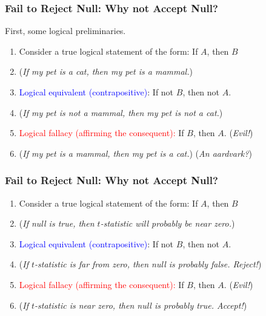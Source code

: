 \documentclass[handout, 9pt]{beamer}
\begin{document}
\begin{frame}
	\frametitle{Fail to Reject Null: Why not Accept Null?}
	First, some logical preliminaries.
	\begin{enumerate}
		\item<2-> Consider a true logical statement of the form: If $A$, then $B$
		\item<3->[] (\emph{If my pet is a cat, then my pet is a mammal.})\\[2em]
		
		\item<4-> \textcolor{blue}{Logical equivalent (contrapositive)}: If not $B$, then not $A$.
		\item<5->[] (\emph{If my pet is not a mammal, then my pet is not a cat.})\\[2em]
		
		\item<6-> \textcolor{red}{Logical fallacy (affirming the consequent):} If $B$, then $A$. \hfill (\emph{Evil!})
		\item<7->[] (\emph{If my pet is a mammal, then my pet is a cat.}) \hfill (\emph{An aardvark?})
	\end{enumerate}
\end{frame}





\begin{frame}
	\frametitle{Fail to Reject Null: Why not Accept Null?}
	\begin{enumerate}
		\item<1-> Consider a true logical statement of the form: If $A$, then $B$
		\item<2->[] (\emph{If null is true, then $t$-statistic will probably be near zero.})\\[2em]
		
		\item<3-> \textcolor{blue}{Logical equivalent (contrapositive)}: If not $B$, then not $A$.
		\item<4->[] (\emph{If $t$-statistic is far from zero, then null is probably false. Reject!})\\[2em]
		
		\item<5-> \textcolor{red}{Logical fallacy (affirming the consequent):} If $B$, then $A$. \hfill (\emph{Evil!})
		\item<6->[] (\emph{If $t$-statistic is near zero, then null is probably true. Accept!})  \\[2em]
	\end{enumerate}
\end{frame}





\end{document}
